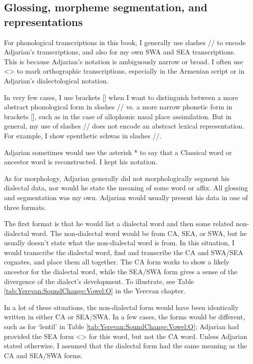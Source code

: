 \subsection{Glossing, morpheme segmentation, and representations}\label{sec:HossepIntro:translation:gloss}

For phonological transcriptions in this book, I generally use slashes // to encode Adjarian's transcriptions, and also for my own SWA and SEA transcriptions. This is because Adjarian's notation is ambiguously narrow or broad. I often use <> to mark orthographic transcriptions, especially in the Armenian script or in Adjarian's dialectological notation. 

In very few cases, I use brackets [] when I want to distinguish between a more abstract phonological form in slashes // vs. a more narrow phonetic form in brackets [], such as in the case of allophonic nasal place assimilation. But in general, my use of slashes // does not encode an abstract lexical representation. For example, I show epenthetic schwas in slashes //. 

Adjarian sometimes would use the asterisk * to say that a Classical word or ancestor word is reconstructed. I kept his notation. 

As for morphology,  Adjarian generally did not morphologically segment his dialectal data, nor would he state the meaning of some word or affix. All glossing and segmentation was my own. Adjarian would usually present his data in one of three formats. 


The first format is that he would list a dialectal word and then some related non-dialectal word. The non-dialectal word would be from CA, SEA, or SWA, but he usually doesn't state what the non-dialectal word is from. In this situation, I would transcribe the dialectal word, find and transcribe the CA and SWA/SEA cognates, and place them all together. The CA form works to show a likely ancestor for the dialectal word, while the SEA/SWA form gives a sense of the divergence of the dialect's development. To illustrate,  see Table \ref{tab:Yerevan:SoundChange:Vowel:O} in  the Yerevan chapter.  


In a lot of these situations, the non-dialectal form would have been identically written in either CA or SEA/SWA. In a few cases, the forms would be different, such as for `lentil' in Table \ref{tab:Yerevan:SoundChange:Vowel:O}; Adjarian had provided the SEA form <> for this word, but not the CA word. Unless Adjarian stated otherwise, I assumed that the dialectal form had the same meaning as the CA and SEA/SWA forms. 

